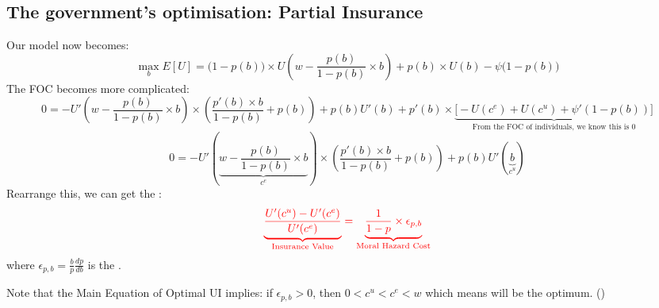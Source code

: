     \subsection{The government's optimisation: Partial Insurance}
        Our model now becomes:
        $$\max_b E[U] = \big(1-p(b)\big)\times{U\left(w-\frac{p(b)}{1-p(b)}\times{b}\right)} + p(b)\times{U(b)} - \psi\big(1-p(b)\big)$$
        The FOC becomes more complicated:
        $$0 = -U'\left( w-\frac{p(b)}{1-p(b)}\times{b} \right)\times{\left(\frac{p'(b)\times{b}}{1-p(b)}+p(b)\right)} + p(b)U'(b) + p'(b)\times\underbrace{\big[-U(c^e)+U(c^u)+\psi'(1-p(b))\big]}_{\text{From\ the\ FOC\ of\ individuals,\ we\ know\ this\ is\ 0}}$$
        $$0 = -U'\left(\underbrace{ w-\frac{p(b)}{1-p(b)}\times{b} }_{c^e}\right)\times{\left(\frac{p'(b)\times{b}}{1-p(b)}+p(b)\right)} + p(b)U'(\underbrace{b}_{c^u})$$
        Rearrange this, we can get the :
        \begin{equation}
            \label{eqn:ui_mh_main}
            \color{red}
            \underbrace{\frac{U'(c^u)-U'(c^e)}{U'(c^e)}}_{\text{Insurance\ Value}} = \underbrace{\frac{1}{1-p}\times{\epsilon_{p,b}}}_{\text{Moral\ Hazard\ Cost}}
        \end{equation}
        where $\epsilon_{p,b} = \frac{b}{p}\frac{dp}{db}$ is the .
        
        Note that the Main Equation of Optimal UI implies: if $\epsilon_{p,b}>0$, then $0<c^u<c^e<w$ which means  will be the optimum. ()
        
